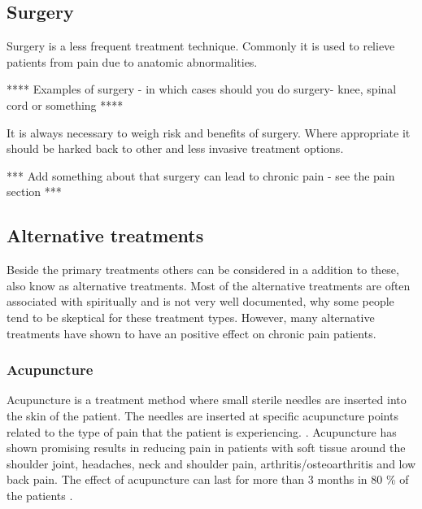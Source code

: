 \subsection{Surgery}
Surgery is a less frequent treatment technique. Commonly it is used to relieve patients from pain due to anatomic abnormalities. \cite{marcus2009,pope2017} 

**** Examples of surgery - in which cases should you do surgery- knee, spinal cord or something ****

It is always necessary to weigh risk and benefits of surgery. Where appropriate it should be harked back to other and less invasive treatment options. \cite{pope2017}

*** Add something about that surgery can lead to chronic pain - see the pain section ***



\subsection{Alternative treatments}
Beside the primary treatments others can be considered in a addition to these, also know as alternative treatments. Most of the alternative treatments are often associated with spiritually and is not very well documented, why some people tend to be skeptical for these treatment types. However, many alternative treatments have shown to have an positive effect on chronic pain patients.

\subsubsection{Acupuncture}
Acupuncture is a treatment method where small sterile needles are inserted into the skin of the patient. The needles are inserted at specific acupuncture points related to the type of pain that the patient is experiencing. \cite{Dhanani2011}. Acupuncture has shown promising results in reducing pain in patients with soft tissue around the shoulder joint, headaches, neck and shoulder pain, arthritis/osteoarthritis and low back pain. The effect of acupuncture can last for more than 3 months in 80 \% of the patients \cite{Junnilla1983}. 


